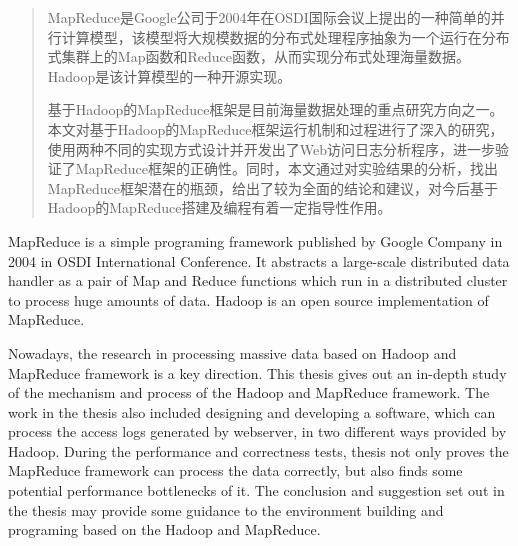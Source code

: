 \begin{abstract}
MapReduce是Google公司于2004年在OSDI国际会议上提出的一种简单的并行计算模型，该模型将大规模数据的分布式处理程序抽象为一个运行在分布式集群上的Map函数和Reduce函数，从而实现分布式处理海量数据。Hadoop是该计算模型的一种开源实现。

基于Hadoop的MapReduce框架是目前海量数据处理的重点研究方向之一。本文对基于Hadoop的MapReduce框架运行机制和过程进行了深入的研究，使用两种不同的实现方式设计并开发出了Web访问日志分析程序，进一步验证了MapReduce框架的正确性。同时，本文通过对实验结果的分析，找出MapReduce框架潜在的瓶颈，给出了较为全面的结论和建议，对今后基于Hadoop的MapReduce搭建及编程有着一定指导性作用。


\end{abstract}

\begin{englishabstract}
MapReduce is a simple programing framework published by Google Company in 2004 in OSDI International Conference. It abstracts a large-scale distributed data handler as a pair of Map and Reduce functions which run in a distributed cluster to process huge amounts of data. Hadoop is an open source implementation of MapReduce.

Nowadays, the research in processing massive data based on Hadoop and MapReduce framework is a key direction. This thesis gives out an in-depth study of the mechanism and process of the Hadoop and MapReduce framework. The work in the thesis also included designing and developing a software, which can process the access logs generated by webserver, in two different ways provided by Hadoop. During the performance and correctness tests, thesis not only proves the MapReduce framework can process the data correctly, but also finds some potential performance bottlenecks of it. The conclusion and suggestion set out in the thesis may provide some guidance to the environment building and programing based on the Hadoop and MapReduce.

\end{englishabstract}

